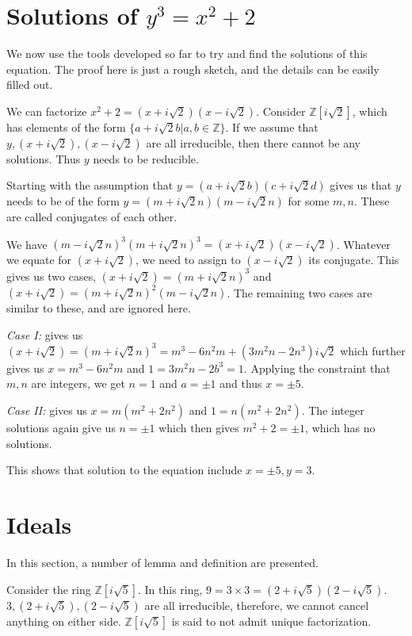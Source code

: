 \section{Solutions of $y^{3} = x^{2} + 2$}
We now use the tools developed so far to try and find the solutions of this equation.
The proof here is just a rough sketch, and the details can be easily filled out.
\par
We can factorize $x^{2} + 2 = (x + i \sqrt{2})(x - i \sqrt{2})$.
Consider $\mathbb{Z}[i \sqrt{2}]$, which has elements of the form $ \{ a + i \sqrt{2} b | a, b \in \mathbb{Z} \}$.
If we assume that $y, (x + i \sqrt{2}), (x - i \sqrt{2})$ are all irreducible, then there cannot be any solutions.
Thus $y$ needs to be reducible.
\par
Starting with the assumption that $y = (a + i \sqrt{2} b)(c + i \sqrt{2} d)$ gives us that $y$ needs to be of the form $y = (m + i \sqrt{2} n)(m - i \sqrt{2}n)$ for some $m, n$.
These are called conjugates of each other.
\par
We have $(m - i \sqrt{2}n)^{3}(m + i \sqrt{2} n)^{3} = (x + i \sqrt{2})(x - i \sqrt{2})$.
Whatever we equate for $(x + i \sqrt{2})$, we need to assign to $(x - i \sqrt{2})$ its conjugate.
This gives us two cases, $(x + i \sqrt{2}) = (m + i \sqrt{2} n)^{3}$ and $(x + i \sqrt{2}) = (m + i \sqrt{2} n)^{2}(m - i \sqrt{2}n)$.
The remaining two cases are similar to these, and are ignored here.
\par
\emph{Case I:} gives us $(x + i \sqrt{2}) = (m + i \sqrt{2} n)^{3} = m^{3} - 6n^{2}m + (3m^{2}n - 2 n^{3}) i \sqrt{2}$ which further gives us $x = m^{3} - 6 n^{2}m$ and $1 = 3m^{2}n - 2 b^{3} = 1$.
Applying the constraint that $m, n$ are integers, we get $n = 1$ and $a = \pm 1$ and thus $x = \pm 5$.
\par
\emph{Case II:} gives us $x = m(m^{2} + 2n^{2})$ and $1 = n(m^{2} + 2n^{2})$.
The integer solutions again give us $n = \pm 1$ which then gives $m^{2} + 2 = \pm 1$, which has no solutions.
\par
This shows that solution to the equation include $x = \pm 5, y = 3$.

\section{Ideals}
In this section, a number of lemma and definition are presented.
\par
Consider the ring $\mathbb{Z}[i\sqrt{5}]$.
In this ring, $9 = 3 \times 3 = (2 + i \sqrt{5})(2 - i \sqrt{5})$.
$3, (2 + i\sqrt{5}), (2 - i\sqrt{5})$ are all irreducible, therefore, we cannot cancel anything on either side.
$\mathbb{Z}[i \sqrt{5}]$ is said to not admit unique factorization.
